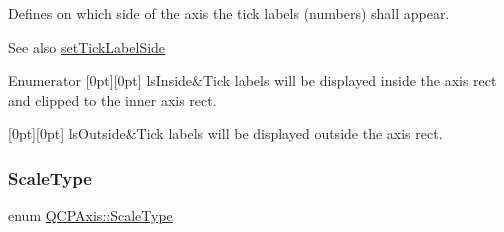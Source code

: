 Defines on which side of the axis the tick labels (numbers) shall appear.

\begin{DoxySeeAlso}{See also}
\mbox{\hyperlink{class_q_c_p_axis_a13ec644fc6e22715744c92c6dfa4f0fa}{set\+Tick\+Label\+Side}} 
\end{DoxySeeAlso}
\begin{DoxyEnumFields}{Enumerator}
[0pt][0pt]{}\mbox{\label{class_q_c_p_axis_a24b13374b9b8f75f47eed2ea78c37db9aae7b027ac2839cf4ad611df30236fc3f}} 
ls\+Inside&Tick labels will be displayed inside the axis rect and clipped to the inner axis rect. \\
\hline

[0pt][0pt]{}\mbox{\label{class_q_c_p_axis_a24b13374b9b8f75f47eed2ea78c37db9a2eadb509fc0c9a8b35b85c86ec9f3c7a}} 
ls\+Outside&Tick labels will be displayed outside the axis rect. \\
\hline

\end{DoxyEnumFields}
\mbox{\label{class_q_c_p_axis_a36d8e8658dbaa179bf2aeb973db2d6f0}} 
\subsubsection{\texorpdfstring{ScaleType}{ScaleType}}
{\footnotesize\ttfamily enum \mbox{\hyperlink{class_q_c_p_axis_a36d8e8658dbaa179bf2aeb973db2d6f0}{Q\+C\+P\+Axis\+::\+Scale\+Type}}}

